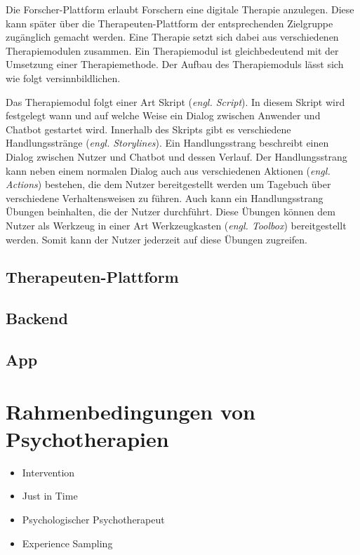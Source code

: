 Die Forscher-Plattform erlaubt Forschern eine digitale Therapie anzulegen. Diese kann später über die Therapeuten-Plattform der entsprechenden Zielgruppe zugänglich gemacht werden. Eine Therapie setzt sich dabei aus verschiedenen Therapiemodulen zusammen. Ein Therapiemodul ist gleichbedeutend mit der Umsetzung einer Therapiemethode. Der Aufbau des Therapiemoduls lässt sich wie folgt versinnbildlichen.

Das Therapiemodul folgt einer Art Skript (\emph{engl. Script}). In diesem Skript wird festgelegt wann und auf welche Weise ein Dialog zwischen Anwender und Chatbot gestartet wird. Innerhalb des Skripts gibt es verschiedene Handlungsstränge (\emph{engl. Storylines}). Ein Handlungsstrang beschreibt einen Dialog zwischen Nutzer und Chatbot und dessen Verlauf. Der Handlungsstrang kann neben einem normalen Dialog auch aus verschiedenen Aktionen (\emph{engl. Actions}) bestehen, die dem Nutzer bereitgestellt werden um Tagebuch über verschiedene Verhaltensweisen zu führen. Auch kann ein Handlungsstrang Übungen beinhalten, die der Nutzer durchführt. Diese Übungen können dem Nutzer als Werkzeug in einer Art Werkzeugkasten (\emph{engl. Toolbox}) bereitgestellt werden. Somit kann der Nutzer jederzeit auf diese Übungen zugreifen.


\subsection{Therapeuten-Plattform}
\subsection{Backend}
\subsection{App}



\section{Rahmenbedingungen von Psychotherapien}

\begin{itemize}
\item Intervention
\item Just in Time
\item Psychologischer Psychotherapeut
\item Experience Sampling
\end{itemize}

